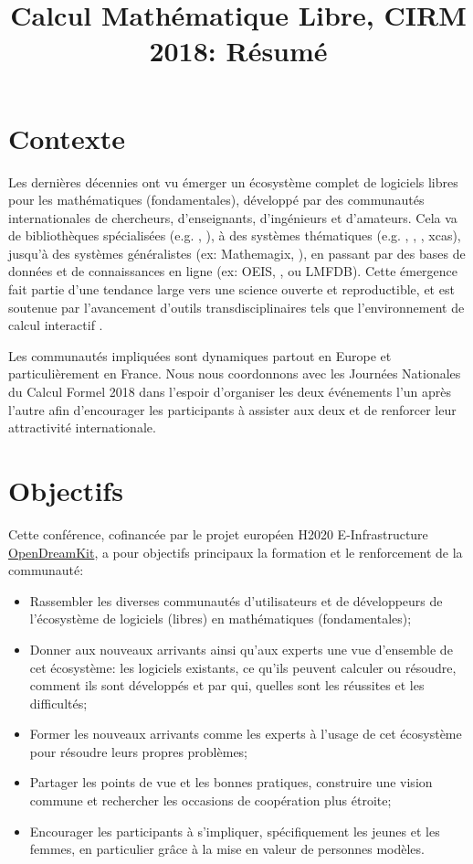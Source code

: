 \documentclass[12pt]{amsart}
\begin{document}
\title{Calcul Mathématique Libre, CIRM 2018: Résumé}
\maketitle
\thispagestyle{empty}

\section*{Contexte}
Les dernières décennies ont vu émerger un écosystème complet de logiciels libres pour les mathématiques (fondamentales), développé par des communautés internationales de chercheurs, d'enseignants, d'ingénieurs et d'amateurs. Cela va de bibliothèques spécialisées (e.g. \MPIR, \Linbox), à des systèmes thématiques (e.g. \GAP, \Pari, \Singular, xcas), jusqu'à des systèmes généralistes (ex: Mathemagix, \Sage), en passant par des bases de données et de connaissances en ligne (ex: OEIS, \MathHub, ou LMFDB). Cette émergence fait partie d'une tendance large vers une science ouverte et reproductible,  et est soutenue par l'avancement d'outils transdisciplinaires tels que l'environnement de calcul interactif \Jupyter.

Les communautés impliquées sont dynamiques partout en Europe et particulièrement en France. Nous nous coordonnons avec les Journées Nationales du Calcul Formel 2018 dans l'espoir d'organiser les deux événements l'un après l'autre afin d'encourager les participants à assister aux deux et de renforcer leur attractivité internationale.

\section*{Objectifs}
Cette conférence, cofinancée par le projet européen H2020 E-Infrastructure \href{opendreamkit.org}{OpenDreamKit}, a pour objectifs principaux la formation et le renforcement de la communauté:
\begin{itemize}
\item Rassembler les diverses communautés d'utilisateurs et de développeurs de l'écosystème de logiciels (libres) en mathématiques (fondamentales);
\item Donner aux nouveaux arrivants ainsi qu'aux experts une vue d'ensemble de cet écosystème: les logiciels existants, ce qu'ils peuvent calculer ou résoudre, comment ils sont développés et par qui, quelles sont les réussites et les difficultés;
\item Former les nouveaux arrivants comme les experts à l'usage de cet écosystème pour résoudre leurs propres problèmes;
\item Partager les points de vue et les bonnes pratiques, construire une vision commune et rechercher les occasions de coopération plus étroite;
\item Encourager les participants à s'impliquer, spécifiquement les jeunes et les femmes, en particulier grâce à la mise en valeur de personnes modèles.
\end{itemize}
\end{document}
